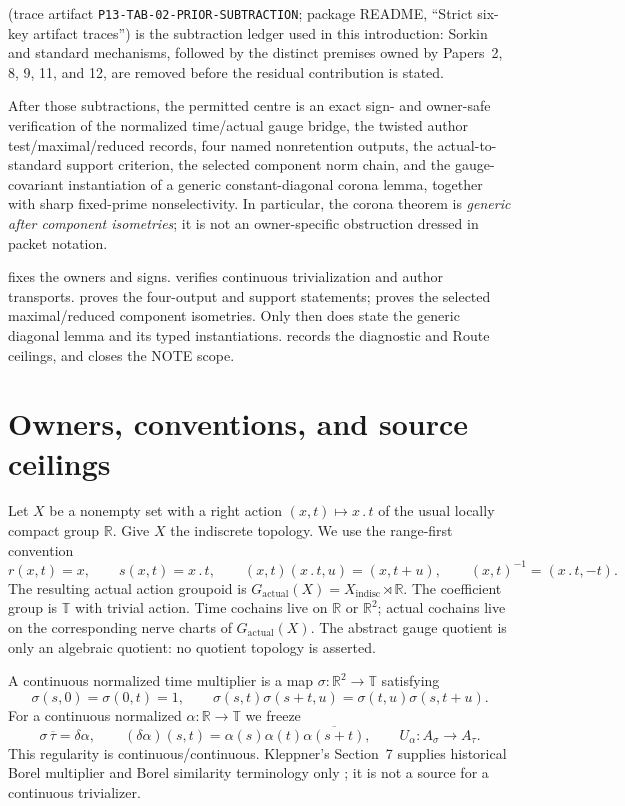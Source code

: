 \documentclass[11pt]{article}
\theoremstyle{definition}
\newcommand{\R}{\mathbb R}
\newcommand{\T}{\mathbb T}
\newcommand{\Gactual}{G_{\mathrm{actual}}}
\newcommand{\TraceRef}[1]{(trace artifact \nolinkurl{#1}; package README,
``Strict six-key artifact traces'')}
\begin{document}
\TraceRef{P13-TAB-02-PRIOR-SUBTRACTION} is the subtraction ledger used in
this introduction: Sorkin and standard mechanisms, followed by the distinct
premises owned by Papers~2, 8, 9, 11, and 12, are removed before the residual
contribution is stated.

After those subtractions, the permitted centre is an exact sign- and
owner-safe verification of the normalized time/actual gauge bridge, the
twisted author test/maximal/reduced records, four named nonretention outputs,
the actual-to-standard support criterion, the selected component norm chain,
and the gauge-covariant instantiation of a generic constant-diagonal corona
lemma, together with sharp fixed-prime nonselectivity.  In particular, the
corona theorem is \emph{generic after component isometries}; it is not an
owner-specific obstruction dressed in packet notation.

 fixes the owners and signs.   verifies
continuous trivialization and author transports.   proves
the four-output and support statements;  proves the
selected maximal/reduced component isometries.  Only then does
 state the generic diagonal lemma and its typed
instantiations.   records the diagnostic and Route
ceilings, and  closes the NOTE scope.

\section{Owners, conventions, and source ceilings}\label{sec:owners}

Let $X$ be a nonempty set with a right action $(x,t)\mapsto x\mathbin{.}t$
of the usual locally compact group $\R$.  Give $X$ the indiscrete topology.
We use the range-first convention
\[
 r(x,t)=x,\qquad s(x,t)=x\mathbin{.}t,\qquad
 (x,t)(x\mathbin{.}t,u)=(x,t+u),\qquad
 (x,t)^{-1}=(x\mathbin{.}t,-t).
\]
The resulting actual action groupoid is
$\Gactual(X)=X_{\mathrm{indisc}}\rtimes\R$.  The coefficient group is
$\T$ with trivial action.  Time cochains live on $\R$ or $\R^2$; actual
cochains live on the corresponding nerve charts of $\Gactual(X)$.  The
abstract gauge quotient is only an algebraic quotient: no quotient topology
is asserted.

A continuous normalized time multiplier is a map
$\sigma:\R^2\to\T$ satisfying
\[
 \sigma(s,0)=\sigma(0,t)=1,
 \qquad
 \sigma(s,t)\sigma(s+t,u)=\sigma(t,u)\sigma(s,t+u).
\]
For a continuous normalized $\alpha:\R\to\T$ we freeze
\begin{equation}\label{eq:gauge-direction}
 \sigma\,\overline\tau=\delta\alpha,
 \qquad
 (\delta\alpha)(s,t)=\alpha(s)\alpha(t)
 \overline{\alpha(s+t)},
 \qquad
 U_\alpha:A_\sigma\longrightarrow A_\tau.
\end{equation}
This regularity is continuous/continuous.  Kleppner's Section~7 supplies
historical Borel multiplier and Borel similarity terminology only
\citep{Kleppner1965Multipliers}; it is not a source for a continuous
trivializer.
\end{document}
